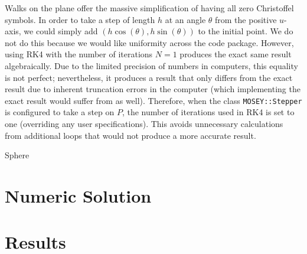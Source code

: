 \documentclass{article}
\begin{document}
	Walks on the plane offer the massive simplification of having all zero Christoffel symbols.
	In order to take a step of length $h$ at an angle $\theta$ from the positive $u$-axis, we could simply add $(h\cos(\theta), h\sin(\theta))$ to the initial point.
	We do not do this because we would like uniformity across the code package.
	However, using RK4 with the number of iterations $N = 1$ produces the exact same result algebraically.
	Due to the limited precision of numbers in computers, this equality is not perfect; nevertheless, it produces a result that only differs from the exact result due to inherent truncation errors in the computer (which implementing the exact result would suffer from as well).
	Therefore, when the class \texttt{MOSEY::Stepper} is configured to take a step on $P$, the number of iterations used in RK4 is set to one (overriding any user specifications).
	This avoids unnecessary calculations from additional loops that would not produce a more accurate result.
	
	Sphere

\section{Numeric Solution}

\section{Results}



\end{document}
